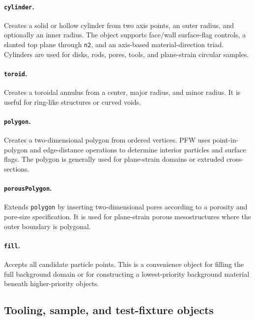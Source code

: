 \paragraph{\texttt{cylinder}.}Creates a solid or hollow cylinder from two axis points, an outer radius, and optionally an inner radius.  The object supports face/wall surface-flag controls, a slanted top plane through \texttt{n2}, and an axis-based material-direction triad.  Cylinders are used for disks, rods, pores, tools, and plane-strain circular samples.

\paragraph{\texttt{toroid}.}Creates a toroidal annulus from a center, major radius, and minor radius.  It is useful for ring-like structures or curved voids.

\paragraph{\texttt{polygon}.}Creates a two-dimensional polygon from ordered vertices.  PFW uses point-in-polygon and edge-distance operations to determine interior particles and surface flags.  The polygon is generally used for plane-strain domains or extruded cross-sections.

\paragraph{\texttt{porousPolygon}.}Extends \texttt{polygon} by inserting two-dimensional pores according to a porosity and pore-size specification.  It is used for plane-strain porous mesostructures where the outer boundary is polygonal.

\paragraph{\texttt{fill}.}Accepts all candidate particle points.  This is a convenience object for filling the full background domain or for constructing a lowest-priority background material beneath higher-priority objects.

\subsection{Tooling, sample, and test-fixture objects}

